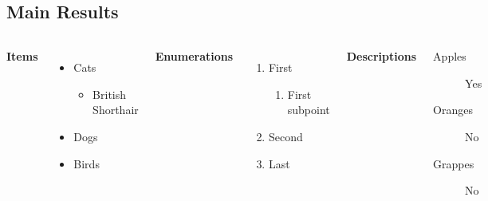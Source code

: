 \documentclass[
11pt,notheorems,compress,hyperref={pdfauthor=Maghfira Ramadhani}
]{beamer}
\begin{document}
\subsection{Main Results}
\begin{frame}
    \begin{columns}[T,onlytextwidth]
      \textbf{Items}
      \begin{itemize}
        \item Cats 
        \begin{itemize}
            \item British Shorthair
        \end{itemize}
        \item Dogs \item Birds
      \end{itemize}

      \textbf{Enumerations}
      \begin{enumerate}
        \item First 
        \begin{enumerate}
            \item First subpoint
        \end{enumerate}
        \item Second \item Last
      \end{enumerate}

      \textbf{Descriptions}
      \begin{description}
        \item[Apples] Yes \item[Oranges] No \item[Grappes] No
      \end{description}
\end{columns}
\end{frame}
\end{document}
